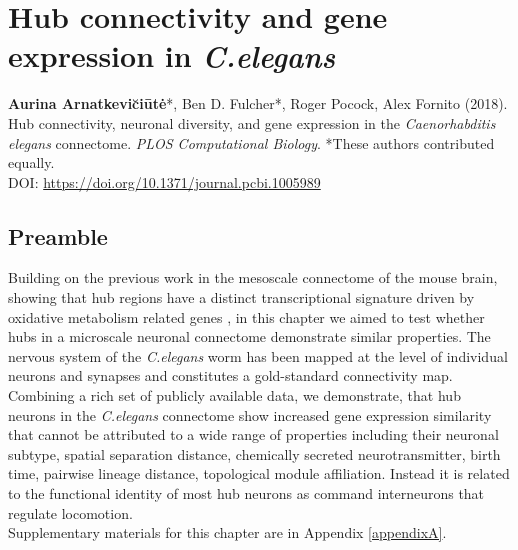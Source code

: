 \chapter{Hub connectivity and gene expression in \textit{C.elegans}}
\label{ch:Chapter2}



\textbf{Aurina Arnatkevi\u{c}i\={u}t\.{e}}*,
Ben D. Fulcher*,
Roger Pocock,
Alex Fornito (2018).
Hub connectivity, neuronal diversity, and gene expression in the \emph{Caenorhabditis elegans} connectome. \textit{PLOS Computational Biology}.
*These authors contributed equally.\\
DOI: \url{https://doi.org/10.1371/journal.pcbi.1005989} %



\section*{Preamble}
Building on the previous work in the mesoscale connectome of the mouse brain, showing that hub regions have a distinct transcriptional signature driven by oxidative metabolism related genes \citep{Fulcher2016}, in this chapter we aimed to test whether hubs in a microscale neuronal connectome demonstrate similar properties. The nervous system of the \textit{C.elegans} worm has been mapped at the level of individual neurons and synapses and constitutes a gold-standard connectivity map. Combining a rich set of publicly available data, we demonstrate, that hub neurons in the \textit{C.elegans} connectome show increased gene expression similarity that cannot be attributed to a wide range of properties including their neuronal subtype, spatial separation distance, chemically secreted neurotransmitter, birth time, pairwise lineage distance, topological module affiliation. Instead it is related to the functional identity of most hub neurons as command interneurons that regulate locomotion. \\ Supplementary materials for this chapter are in Appendix \ref{appendixA}.


\newpage

